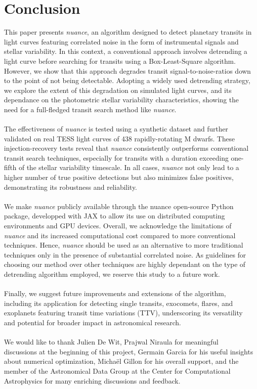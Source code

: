 \documentclass[modern]{aastex631}
\newcommand{\nuancemethod}{\textit{nuance}}
\newcommand{\nuancecode}{\textsf{nuance}}
\begin{document}
\section{Conclusion}\label{conclusion}
This paper presents \nuancemethod{}, an algorithm designed to detect planetary transits in light curves featuring correlated noise in the form of instrumental signals and stellar variability. In this context, a conventional approach involves detrending a light curve before searching for transits using a Box-Least-Square algorithm. However, we show that this approach degrades transit signal-to-noise-ratios down to the point of not being detectable. Adopting a widely used detrending strategy, we explore the extent of this degradation on simulated light curves, and its dependance on the photometric stellar variability characteristics, showing the need for a full-fledged transit search method like \nuancemethod{}.\\\\
The effectiveness of \nuancemethod{} is tested using a synthetic dataset and further validated on real TESS light curves of 438 rapidly-rotating M dwarfs. These injection-recovery tests reveal that \nuancemethod{} consistently outperforms conventional transit search techniques, especially for transits with a duration exceeding one-fifth of the stellar variability timescale. In all cases, \nuancemethod{} not only lead to a higher number of true positive detections but also minimizes false positives, demonstrating its robustness and reliability.\\\\
We make \nuancemethod{} publicly available through the \nuancecode{} open-source Python package, developped with \textsf{JAX} to allow its  use on distributed computing environments and GPU devices. Overall, we acknowledge the limitations of \nuancemethod{} and its increased computational cost compared to more conventional techniques. Hence, \nuancemethod{} should be used as an alternative to more traditional techniques only in the presence of substantial correlated noise. As guidelines for choosing our method over other techniques are highly dependant on the type of detrending algorithm employed, we reserve this study to a future work.\\\\
Finally, we suggest future improvements and extensions of the algorithm, including its application for detecting single transits, exocomets, flares, and exoplanets featuring transit time variations (TTV), underscoring its versatility and potential for broader impact in astronomical research.
\\\\
\vfill{}
We would like to thank Julien De Wit, Prajwal Niraula for meaningful discussions at the beginning of this project, Germain Garcia for his useful insights about numerical optimization, Michaël Gillon for his overall support, and the member of the Astronomical Data Group at the Center for Computational Astrophysics for many enriching discussions and feedback.
\end{document}

